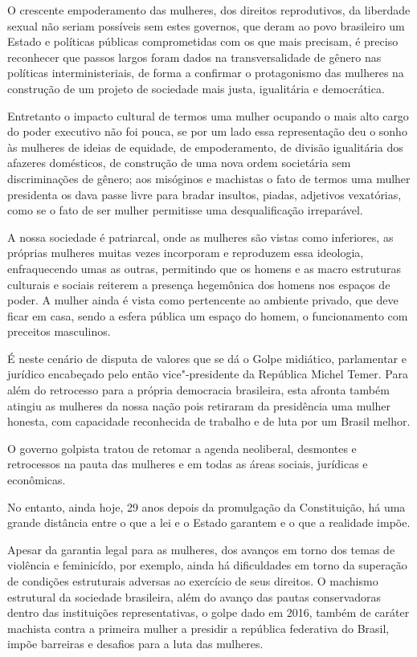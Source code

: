 O crescente empoderamento das mulheres, dos direitos reprodutivos, da
liberdade sexual não seriam possíveis sem estes governos, que deram ao
povo brasileiro um Estado e políticas públicas comprometidas com os que
mais precisam, é preciso reconhecer que passos largos foram dados na
transversalidade de gênero nas políticas interministeriais, de forma a
confirmar o protagonismo das mulheres na construção de um projeto de
sociedade mais justa, igualitária e democrática.

Entretanto o impacto cultural de termos uma mulher ocupando o mais alto
cargo do poder executivo não foi pouca, se por um lado essa
representação deu o sonho às mulheres de ideias de equidade, de
empoderamento, de divisão igualitária dos afazeres domésticos, de
construção de uma nova ordem societária sem discriminações de gênero;
aos misóginos e machistas o fato de termos uma mulher presidenta os dava
passe livre para bradar insultos, piadas, adjetivos vexatórias, como se
o fato de ser mulher permitisse uma desqualificação irreparável.

A nossa sociedade é patriarcal, onde as mulheres são vistas como
inferiores, as próprias mulheres muitas vezes incorporam e reproduzem
essa ideologia, enfraquecendo umas as outras, permitindo que os homens e
as macro estruturas culturais e sociais reiterem a presença hegemônica
dos homens nos espaços de poder. A mulher ainda é vista como pertencente
ao ambiente privado, que deve ficar em casa, sendo a esfera pública um
espaço do homem, o funcionamento com preceitos masculinos.

É neste cenário de disputa de valores que se dá o Golpe midiático,
parlamentar e jurídico encabeçado pelo então vice"-presidente da
República Michel Temer. Para além do retrocesso para a própria
democracia brasileira, esta afronta também atingiu as mulheres da nossa
nação pois retiraram da presidência uma mulher honesta, com capacidade
reconhecida de trabalho e de luta por um Brasil melhor.

O governo golpista tratou de retomar a agenda neoliberal, desmontes e
retrocessos na pauta das mulheres e em todas as áreas sociais, jurídicas
e econômicas.

No entanto, ainda hoje, 29 anos depois da promulgação da Constituição,
há uma grande distância entre o que a lei e o Estado garantem e o que a
realidade impõe.

Apesar da garantia legal para as mulheres, dos avanços em torno dos
temas de violência e feminicído, por exemplo, ainda há dificuldades em
torno da superação de condições estruturais adversas ao exercício de
seus direitos. O machismo estrutural da sociedade brasileira, além do
avanço das pautas conservadoras dentro das instituições representativas,
o golpe dado em 2016, também de caráter machista contra a primeira
mulher a presidir a república federativa do Brasil, impõe barreiras e
desafios para a luta das mulheres.

